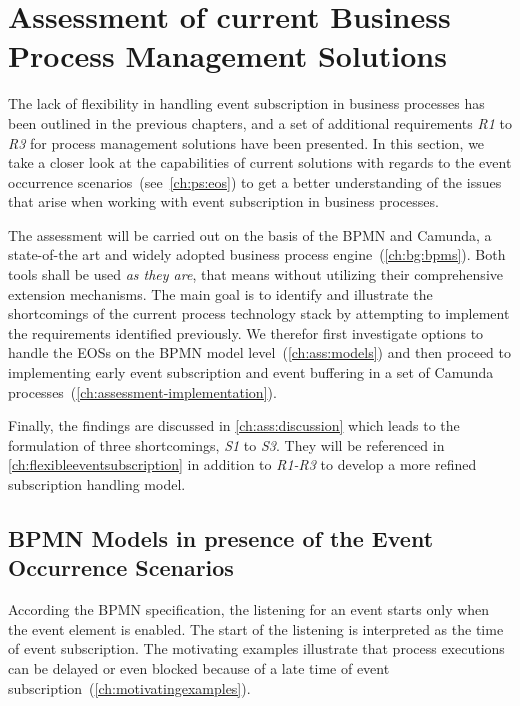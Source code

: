 \chapter{Assessment of current Business Process Management Solutions}\label{ch:assessment}

The lack of flexibility in handling event subscription in business processes has been outlined in the previous chapters, and a set of additional requirements \textit{R1} to \textit{R3} for process management solutions have been presented.
In this section, we take a closer look at the capabilities of current solutions with regards to the event occurrence scenarios~(see~\autoref{ch:ps:eos}) to get a better understanding of the issues that arise when working with event subscription in business processes.

The assessment will be carried out on the basis of the \ac{BPMN} and Camunda, a state-of-the art and widely adopted business process engine~(\autoref{ch:bg:bpms}). Both tools shall be used \textit{as they are}, that means without utilizing their comprehensive extension mechanisms.
The main goal is to identify and illustrate the shortcomings of the current process technology stack by attempting to implement the requirements identified previously.
We therefor first investigate options to handle the \acs{EOS}s on the BPMN model level~(\autoref{ch:ass:models}) and then proceed to implementing early event subscription and event buffering in a set of Camunda processes~(\autoref{ch:assessment-implementation}).

Finally, the findings are discussed in \autoref{ch:ass:discussion} which leads to the formulation of three shortcomings, \textit{S1} to \textit{S3}.
They will be referenced in \autoref{ch:flexibleeventsubscription} in addition to \textit{R1-R3} to develop a more refined subscription handling model.

\section{BPMN Models in presence of the Event Occurrence Scenarios}\label{ch:ass:models}

According the BPMN specification, the listening for an event starts only when the event element is enabled. The start of the listening is interpreted as the time of event subscription.
The motivating examples illustrate that process executions can be delayed or even blocked because of a late time of event subscription~(\autoref{ch:motivatingexamples}).

